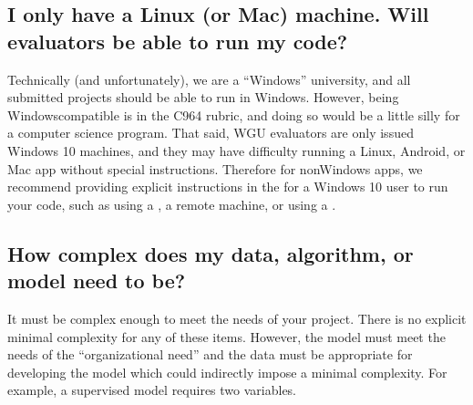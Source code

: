 \documentclass[letterpaper,10pt,english]{jupyterBook}
\begin{document}
\subsection{I only have a Linux (or Mac) machine. Will evaluators be able to run my code?}
\label{\detokenize{task1:i-only-have-a-linux-or-mac-machine-will-evaluators-be-able-to-run-my-code}}
\sphinxAtStartPar
Technically (and unfortunately), we are a “Windows” university, and all submitted projects should be able to run in Windows. However, being Windows\sphinxhyphen{}compatible is  in the C964 rubric, and doing so would be a little silly for a computer science program. That said, WGU evaluators are only issued Windows 10 machines, and they may have difficulty running a Linux, Android, or Mac app without special instructions. Therefore for non\sphinxhyphen{}Windows apps, we recommend providing explicit instructions in the {\hyperref[\detokenize{task2_doc/task2_doc_d:task2-doc-d-user-guide}]{}} for a Windows 10 user to run your code, such as using a , a remote machine, or using a .


\subsection{How complex does my data, algorithm, or model need to be?}
\label{\detokenize{task1:how-complex-does-my-data-algorithm-or-model-need-to-be}}
\sphinxAtStartPar
It must be complex enough to meet the needs of your project. There is no explicit minimal complexity for any of these items. However, the model must meet the needs of the “organizational need” and the data must be appropriate for developing the model which could indirectly impose a minimal complexity. For example, a supervised model requires two variables.
\end{document}
